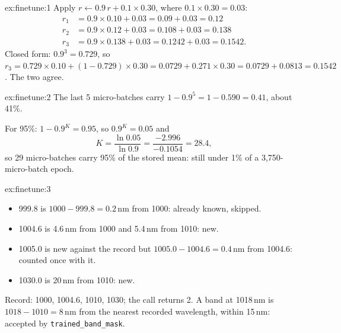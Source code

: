 
\begin{solution}{ex:finetune:1}
Apply $r \leftarrow 0.9\,r + 0.1 \times 0.30$, where $0.1 \times 0.30 = 0.03$:
\begin{align*}
  r_1 &= 0.9 \times 0.10 + 0.03 = 0.09 + 0.03 = 0.12\\
  r_2 &= 0.9 \times 0.12 + 0.03 = 0.108 + 0.03 = 0.138\\
  r_3 &= 0.9 \times 0.138 + 0.03 = 0.1242 + 0.03 = 0.1542.
\end{align*}
Closed form: $0.9^3 = 0.729$, so $r_3 = 0.729 \times 0.10 + (1 - 0.729) \times 0.30 = 0.0729 + 0.271 \times 0.30 = 0.0729 + 0.0813 = 0.1542$. The two agree.
\end{solution}

\begin{solution}{ex:finetune:2}
The last 5 micro-batches carry $1 - 0.9^5 = 1 - 0.590 = 0.41$, about 41\%.

For 95\%: $1 - 0.9^K = 0.95$, so $0.9^K = 0.05$ and
\[
  K = \frac{\ln 0.05}{\ln 0.9} = \frac{-2.996}{-0.1054} = 28.4,
\]
so 29 micro-batches carry 95\% of the stored mean: still under 1\% of a 3,750-micro-batch epoch.
\end{solution}

\begin{solution}{ex:finetune:3}
\begin{itemize}
  \item 999.8 is $1000 - 999.8 = 0.2$\,nm from 1000: already known, skipped.
  \item 1004.6 is 4.6\,nm from 1000 and 5.4\,nm from 1010: new.
  \item 1005.0 is new against the record but $1005.0 - 1004.6 = 0.4$\,nm from 1004.6: counted once with it.
  \item 1030.0 is 20\,nm from 1010: new.
\end{itemize}
Record: 1000, 1004.6, 1010, 1030; the call returns 2. A band at 1018\,nm is $1018 - 1010 = 8$\,nm from the nearest recorded wavelength, within 15\,nm:
accepted by \texttt{trained\_band\_mask}.
\end{solution}

